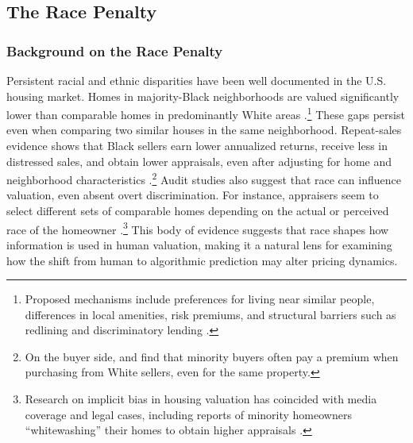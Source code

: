 \documentclass[11pt]{article}
\begin{document}
\subsection{The Race Penalty}\label{sec:racepenalty}
\subsubsection{Background on the Race Penalty}
Persistent racial and ethnic disparities have been well documented in the U.S. housing market. Homes in majority-Black neighborhoods are valued significantly lower than comparable homes in predominantly White areas \citep{harris1999, perryDEVALUATIONASSETSBLACK, elsterMinoritiesPropertyValues2022}.\footnote{Proposed mechanisms include preferences for living near similar people, differences in local amenities, risk premiums, and structural barriers such as redlining and discriminatory lending \citep{lewisracialcomposition, caseyRaceEthnicitySocioeconomic, tessumairpollution2021, cutlerRiseDeclineAmerican1999}.} These gaps persist even when comparing two similar houses in the same neighborhood. Repeat-sales evidence shows that Black sellers earn lower annualized returns, receive less in distressed sales, and obtain lower appraisals, even after adjusting for home and neighborhood characteristics \citep{drukker2024racial, kermaniRacialDisparitiesHousing2021, freddiemac2021, perryBiasedAppraisalsDevaluation2021}.\footnote{On the buyer side, \citet{box-couillard_racial_2024} and \citet{bayerRacialEthnicPrice2017} find that minority buyers often pay a premium when purchasing from White sellers, even for the same property.} Audit studies also suggest that race can influence valuation, even absent overt discrimination. For instance, appraisers seem to select different sets of comparable homes depending on the actual or perceived race of the homeowner \citep{lilienjakeFaultyFoundationsMysteryShopper, howell_appraised_2022}.\footnote{Research on implicit bias in housing valuation has coincided with media coverage and legal cases, including reports of minority homeowners “whitewashing” their homes to obtain higher appraisals \citep{kamindebraHomeAppraisedBlack2023, howell2018NeighborhoodsRA}.} This body of evidence suggests that race shapes how information is used in human valuation, making it a natural lens for examining how the shift from human to algorithmic prediction may alter pricing dynamics.

\end{document}
